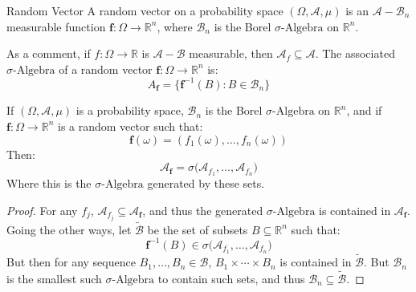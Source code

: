     \begin{ldefinition}{Random Vector}
        A random vector on a probability space
        $(\Omega,\mathcal{A},\mu)$ is an
        $\mathcal{A}-\mathcal{B}_{n}$ measurable function
        $\mathbf{f}:\Omega\rightarrow\mathbb{R}^{n}$, where
        $\mathcal{B}_{n}$ is the Borel $\sigma\textrm{-Algebra}$
        on $\mathbb{R}^{n}$.
    \end{ldefinition}
    As a comment, if $f:\Omega\rightarrow\mathbb{R}$ is
    $\mathcal{A}-\mathcal{B}$ measurable, then
    $\mathcal{A}_{f}\subseteq\mathcal{A}$. The associated
    $\sigma\textrm{-Algebra}$ of a random vector
    $\mathbf{f}:\Omega\rightarrow\mathbb{R}^{n}$ is:
    \begin{equation}
        A_{\mathbf{f}}
        =\{\mathbf{f}^{\minus{1}}(B):B\in\mathcal{B}_{n}\}
    \end{equation}
    \begin{theorem}
        If $(\Omega,\mathcal{A},\mu)$ is a probability space,
        $\mathcal{B}_{n}$ is the Borel $\sigma\textrm{-Algebra}$
        on $\mathbb{R}^{n}$, and if
        $\mathbf{f}:\Omega\rightarrow\mathbb{R}^{n}$ is a random
        vector such that:
        \begin{equation}
            \mathbf{f}(\omega)=(f_{1}(\omega),\dots,f_{n}(\omega))
        \end{equation}
        Then:
        \begin{equation}
            \mathcal{A}_{\mathbf{f}}=
            \sigma\big(
                \mathcal{A}_{f_{1}},\dots,\mathcal{A}_{f_{n}}\big)
        \end{equation}
        Where this is the $\sigma\textrm{-Algebra}$ generated by
        these sets.
    \end{theorem}
    \begin{proof}
        For any $f_{j}$,
        $\mathcal{A}_{f_{j}}\subseteq\mathcal{A}_{\mathbf{f}}$,
        and thus the generated $\sigma\textrm{-Algebra}$ is
        contained in $\mathcal{A}_{\mathbf{f}}$. Going the other
        ways, let $\tilde{\mathcal{B}}$ be the set of subsets
        $B\subseteq\mathbb{R}^{n}$ such that:
        \begin{equation}
            \mathbf{f}^{\minus{1}}(B)\in
            \sigma\big(
                \mathcal{A}_{f_{1}},\dots,\mathcal{A}_{f_{n}}\big)
        \end{equation}
        But then for any sequence $B_{1},\dots,B_{n}\in\mathcal{B}$,
        $B_{1}\times\cdots\times{B}_{n}$ is contained in
        $\tilde{\mathcal{B}}$. But $\mathcal{B}_{n}$ is the
        smallest such $\sigma\textrm{-Algebra}$ to contain such
        sets, and thus
        $\mathcal{B}_{n}\subseteq\tilde{\mathcal{B}}$.
    \end{proof}
